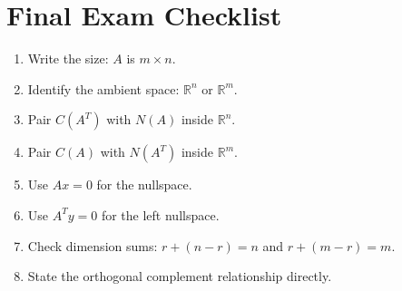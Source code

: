 \documentclass[10pt]{article}
\begin{document}
\section{Final Exam Checklist}

\begin{enumerate}
  \item Write the size: \(A\) is \(m\times n\).
  \item Identify the ambient space: \(\mathbb{R}^n\) or \(\mathbb{R}^m\).
  \item Pair \(C(A^{T})\) with \(N(A)\) inside \(\mathbb{R}^n\).
  \item Pair \(C(A)\) with \(N(A^{T})\) inside \(\mathbb{R}^m\).
  \item Use \(Ax=0\) for the nullspace.
  \item Use \(A^{T}y=0\) for the left nullspace.
  \item Check dimension sums: \(r+(n-r)=n\) and \(r+(m-r)=m\).
  \item State the orthogonal complement relationship directly.
\end{enumerate}
\end{document}
